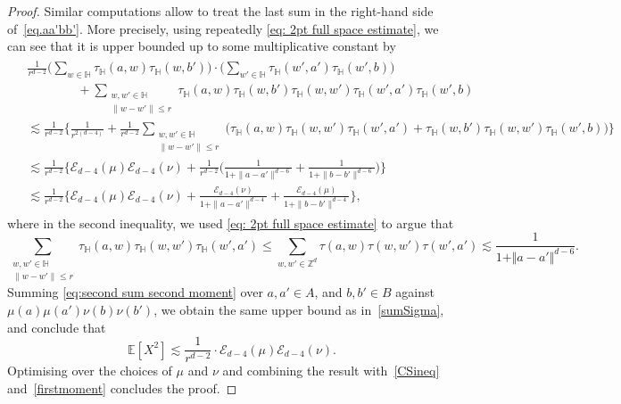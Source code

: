 \documentclass[11pt,a4paper]{article}
\numberwithin{equation}{section}
\theoremstyle{plain}
\theoremstyle{definition}
\begin{document}
\begin{proof}
Similar computations allow to treat  the last sum in the right-hand side of~\eqref{eq.aa'bb'}. More precisely, using repeatedly \eqref{eq: 2pt full space estimate}, we can see that it is upper bounded up to some multiplicative constant by 
\begin{align}\label{eq:second sum second moment}
\begin{split}
& \frac{1}{r^{d-2}} \Big(\sum_{w\in \mathbb H}  \tau_{\mathbb H}(a,w)\tau_{\mathbb H}(w,b')\Big) \cdot \Big( \sum_{w'\in \mathbb H} \tau_{\mathbb H}(w',a')\tau_{\mathbb H}(w',b)\Big) \\
& \qquad\qquad+ \sum_{\substack{w,w'\in \mathbb H\\\|w-w'\|\le r}} \tau_{\mathbb H}(a,w)\tau_{\mathbb H}(w,b')\tau_{\mathbb H}(w,w') \tau_{\mathbb H}(w',a')\tau_{\mathbb H}(w',b) \\
&\lesssim \frac 1{r^{d-2}}\Big\{\frac 1{r^{2(d-4)}} +  \frac 1{r^{d-2}} \sum_{\substack{w,w'\in \mathbb H\\\|w-w'\|\le r}} \Big( \tau_{\mathbb H}(a,w)\tau_{\mathbb H}(w,w') \tau_{\mathbb H}(w',a') + \tau_{\mathbb H}(w,b')\tau_{\mathbb H}(w,w') \tau_{\mathbb H}(w',b)\Big)\Big\} \\
& \lesssim \frac 1{r^{d-2}}\Big\{\mathcal E_{d-4}(\mu)\mathcal E_{d-4}(\nu) + \frac 1{r^{d-2}} \Big(\frac 1{1+\|a-a'\|^{d-6}} + \frac 1{1+\|b-b'\|^{d-6}}\Big) \Big\} \\
& \lesssim  \frac 1{r^{d-2}}\Big\{\mathcal E_{d-4}(\mu)\mathcal E_{d-4}(\nu) + \frac {\mathcal E_{d-4}(\nu)}{1+\|a-a'\|^{d-4}} + \frac {\mathcal E_{d-4}(\mu)}{1+\|b-b'\|^{d-4}} \Big\}, 
\end{split}
\end{align} 
where in the second inequality, we used \eqref{eq: 2pt full space estimate} to argue that
\begin{equation}
	\sum_{\substack{w,w'\in \mathbb H\\\|w-w'\|\le r}}\tau_{\mathbb H}(a,w)\tau_{\mathbb H}(w,w') \tau_{\mathbb H}(w',a')\leq \sum_{w,w'\in \mathbb Z^d}\tau(a,w)\tau(w,w') \tau(w',a') \lesssim \frac{1}{1+\Vert a-a'\Vert^{d-6}}.
\end{equation}
Summing \eqref{eq:second sum second moment} over $a,a'\in A$, and $b,b'\in B$ against $\mu(a)\mu(a')\nu(b)\nu(b')$, we obtain the same upper bound as in~\eqref{sumSigma}, and conclude that
\begin{equation}
\mathbb E[X^2] \lesssim \frac 1{r^{d-2}} \cdot \mathcal E_{d-4}(\mu) \mathcal E_{d-4}(\nu).
\end{equation}
Optimising over the choices of $\mu$ and $\nu$ and combining the result with~\eqref{CSineq} and~\eqref{firstmoment} concludes the proof. 
\end{proof}  
\end{document}
